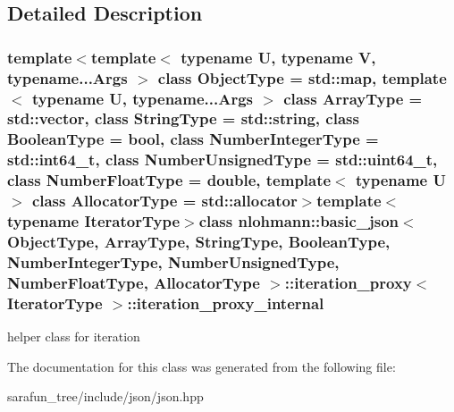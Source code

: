 \subsection{Detailed Description}
\subsubsection*{template$<$template$<$ typename U, typename V, typename...\-Args $>$ class Object\-Type = std\-::map, template$<$ typename U, typename...\-Args $>$ class Array\-Type = std\-::vector, class String\-Type = std\-::string, class Boolean\-Type = bool, class Number\-Integer\-Type = std\-::int64\-\_\-t, class Number\-Unsigned\-Type = std\-::uint64\-\_\-t, class Number\-Float\-Type = double, template$<$ typename U $>$ class Allocator\-Type = std\-::allocator$>$template$<$typename Iterator\-Type$>$class nlohmann\-::basic\-\_\-json$<$ Object\-Type, Array\-Type, String\-Type, Boolean\-Type, Number\-Integer\-Type, Number\-Unsigned\-Type, Number\-Float\-Type, Allocator\-Type $>$\-::iteration\-\_\-proxy$<$ Iterator\-Type $>$\-::iteration\-\_\-proxy\-\_\-internal}

helper class for iteration 

The documentation for this class was generated from the following file\-:\begin{DoxyCompactItemize}
\item 
sarafun\-\_\-tree/include/json/json.\-hpp\end{DoxyCompactItemize}
